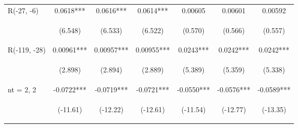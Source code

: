 \documentclass[]{article}
\begin{document}
\begin{center}
\begin{tabular}{lcccccc}
R(-27, -6) & 0.0618*** & 0.0616*** & 0.0614*** & 0.00605 & 0.00601 & 0.00592 \\
\vspace{4pt} & \begin{footnotesize}(6.548)\end{footnotesize} & \begin{footnotesize}(6.533)\end{footnotesize} & \begin{footnotesize}(6.522)\end{footnotesize} & \begin{footnotesize}(0.570)\end{footnotesize} & \begin{footnotesize}(0.566)\end{footnotesize} & \begin{footnotesize}(0.557)\end{footnotesize} \\
R(-119, -28) & 0.00961*** & 0.00957*** & 0.00955*** & 0.0243*** & 0.0242*** & 0.0242*** \\
\vspace{4pt} & \begin{footnotesize}(2.898)\end{footnotesize} & \begin{footnotesize}(2.894)\end{footnotesize} & \begin{footnotesize}(2.889)\end{footnotesize} & \begin{footnotesize}(5.389)\end{footnotesize} & \begin{footnotesize}(5.359)\end{footnotesize} & \begin{footnotesize}(5.338)\end{footnotesize} \\
nt = 2, 2 & -0.0722*** & -0.0719*** & -0.0721*** & -0.0550*** & -0.0576*** & -0.0589*** \\
\vspace{4pt} & \begin{footnotesize}(-11.61)\end{footnotesize} & \begin{footnotesize}(-12.22)\end{footnotesize} & \begin{footnotesize}(-12.61)\end{footnotesize} & \begin{footnotesize}(-11.54)\end{footnotesize} & \begin{footnotesize}(-12.77)\end{footnotesize} & \begin{footnotesize}(-13.35)\end{footnotesize} \\

\end{tabular}
\end{center}
\end{document}

